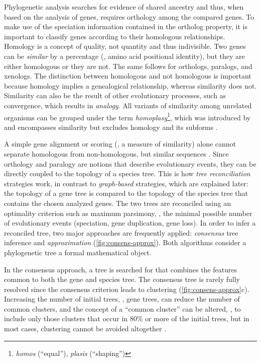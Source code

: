 \label{sec:orthology-howto}
Phylogenetic analysis searches for evidence of shared ancestry and thus, when
based on the analysis of genes, requires orthology among the compared genes. To
make use of the speciation information contained in the ortholog property, it is
important to classify genes according to their homologous relationships.
Homology is a concept of quality, not quantity \citep{reeck1987} and thus
indivisible. Two genes can be \emph{similar} by a percentage (\eg, amino acid
positional identity), but they are either homologous or they are not. The same
follows for orthologs, paralogs, and xenologs. The distinction between
homologous and not homologous is important because homology implies a
genealogical relationship, whereas similarity does not. Similarity can also be
the result of other evolutionary processes, such as convergence, which results
in \emph{analogy}. All variants of similarity among unrelated organisms can be
grouped under the term \emph{homoplasy}\footnote{\emph{homos} (``equal''),
\emph{plasis} (``shaping'')}, which was introduced by \citet{lankester1870} and
encompasses similarity but excludes homology and its subforms \citep{page1998}.

A simple gene alignment or scoring (\ie, a measure of similarity) alone cannot
separate homologous from non-homologous, but similar sequences
\citep{eisen1998}. Since orthology and paralogy are notions that describe
evolutionary events, they can be directly coupled to the topology of a species
tree. This is how \emph{tree reconciliation} strategies work, in contrast to
\emph{graph-based} strategies, which are explained later: the topology of a gene
tree is compared to the topology of the species tree that contains the chosen
analyzed genes. The two trees are reconciled using an optimality criterion such
as maximum parsimony, \ie, the minimal possible number of evolutionary events
(speciation, gene duplication, gene loss). In order to infer a reconciled tree,
two major approaches are frequently applied: \emph{consensus} tree inference and
\emph{approximation} (\autoref{fig:consens-approx}). Both algorithms consider a
phylogenetic tree a formal mathematical object.

In the consensus approach, a tree is searched for that combines the features
common to both the gene and species tree. The consensus tree is rarely fully
resolved since the consensus criterion leads to clustering
(\autoref{fig:consens-approx}c). Increasing the number of initial trees, \eg,
gene trees, can reduce the number of common clusters, and the concept of a
``common cluster'' can be altered, \eg, to include only those clusters that
occur in 80\% or more of the initial trees, but in most cases, clustering cannot
be avoided altogether \citep{mirkin1995}.

